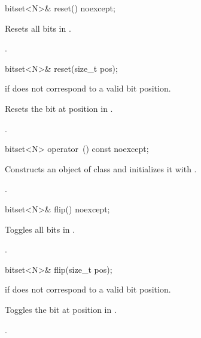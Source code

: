 %
\begin{itemdecl}
bitset<N>& reset() noexcept;
\end{itemdecl}

\begin{itemdescr}
\pnum
\effects
Resets all bits in
.

\pnum
\returns
{}.
\end{itemdescr}

%
\begin{itemdecl}
bitset<N>& reset(size_t pos);
\end{itemdecl}

\begin{itemdescr}
\pnum
\throws
{}
if  does not correspond to a valid bit position.
%

\pnum
\effects
Resets the bit at position  in
.

\pnum
\returns
{}.
\end{itemdescr}

%
\begin{itemdecl}
bitset<N> operator~() const noexcept;
\end{itemdecl}

\begin{itemdescr}
\pnum
\effects
Constructs an object  of class
and initializes it with
.

\pnum
\returns
{}.
\end{itemdescr}

%
\begin{itemdecl}
bitset<N>& flip() noexcept;
\end{itemdecl}

\begin{itemdescr}
\pnum
\effects
Toggles all bits in
.

\pnum
\returns
{}.
\end{itemdescr}

%
\begin{itemdecl}
bitset<N>& flip(size_t pos);
\end{itemdecl}

\begin{itemdescr}
\pnum
\throws
{}
if  does not correspond to a valid bit position.%

\pnum
\effects
Toggles the bit at position  in
.

\pnum
\returns
{}.
\end{itemdescr}

